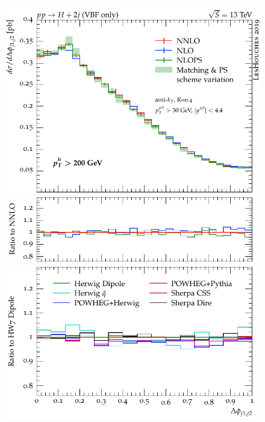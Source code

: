 \documentclass[10pt,prd,fleqn,superscriptaddress,notitlepage,nofootinbib,preprintnumbers,nobalancelastpage]{revtex4-1}
\begin{document}
\begin{figure}[tp]
\begin{minipage}{.32\textwidth}
    \includegraphics[width=\textwidth]{figures/tools/delta_phi_jj12_pth200.pdf}
    \includegraphics[width=\textwidth]{figures/tools/delta_phi_jj12_pth200_rFO.pdf}
    \includegraphics[width=\textwidth]{figures/tools/delta_phi_jj12_pth200_rMC.pdf}
  \end{minipage}\hfill
  \begin{minipage}{.32\textwidth}

\end{minipage}
\end{figure}
\end{document}
